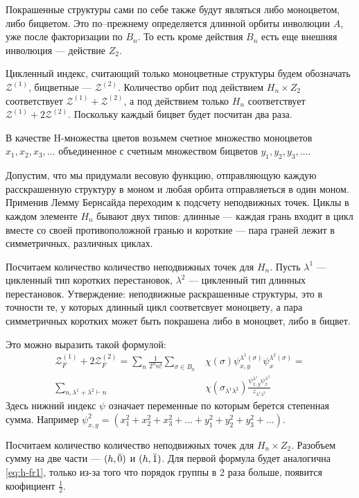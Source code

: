 Покрашенные структуры сами по себе также будут являться либо моноцветом, либо
бицветом. Это по--прежнему определяется длинной орбиты инволюции $A$, уже
после факторизации по $B_n$. То есть кроме действия $B_n$ есть еще внешняя
инволюция --- действие $Z_2$.

Цикленный индекс, считающий только моноцветные структуры будем обозначать
$\mathcal Z^{(1)}$, бицветные --- $\mathcal Z^{(2)}$. Количество орбит под
действием $H_n \times Z_2$ соответствует $\mathcal Z^{(1)} + \mathcal Z^{(2)}$,
а под действием только $H_n$ соответствует $\mathcal Z^{(1)} + 2\mathcal
Z^{(2)}$. Поскольку каждый бицвет будет посчитан два раза.

В качестве H-множества цветов возьмем счетное множество моноцветов $x_1, x_2,
x_3, \dots$ объединенное с счетным множеством бицветов $y_1, y_2, y_3, \dots$.

Допустим, что мы придумали весовую функцию, отправляющую каждую расскрашенную
структуру в моном и любая орбита отправляеться в один моном. Применив Лемму
Бернсайда переходим к подсчету неподвижных точек. Циклы в каждом элементе $H_n$
бывают двух типов:
длинные --- каждая грань входит в цикл вместе со своей противоположной гранью и
короткие --- пара граней лежит в симметричных, различных циклах. 

Посчитаем количество количество неподвижных точек для $H_n$. Пусть $\lambda^1$
--- цикленный тип коротких перестановок, $\lambda^2$ --- цикленный тип длинных
перестановок. Утверждение: неподвижные раскрашенные структуры, это в точности
те, у которых длинный цикл соответсвует моноцвету, а пара симметричных коротких 
может быть покрашена либо в моноцвет, либо в бицвет.

Это можно выразить такой формулой:
\begin{equation}
\label{eq:h-fr1}
\begin{split}
\mathcal Z_F^{(1)} + 2\mathcal Z_F^{(2)} = 
\sum_{n}\frac{1}{2^{n}n!}\sum_{\sigma \in B_n}&\chi(\sigma)
\psi_{x, y}^{\lambda^1(\sigma)} \psi_{x}^{\lambda^2(\sigma)} = \\
\sum_{n, \lambda^1 + \lambda^2 \vdash n}&\chi(\sigma_{\lambda^1 \lambda^2})
\frac{\psi_{x, y}^{\lambda^1} \psi_{x}^{\lambda^2}}{z_{\lambda^1 \lambda^2}}
\end{split}
\end{equation}
Здесь нижний индекс $\psi$ означает переменные по которым берется степенная
сумма. Например $\psi_{x, y}^2 =  (x_1^2 + x_2^2 + x_3^2 + \dots + y_1^2 + y_2^2
+ y_3^2 + \dots)$.

Посчитаем количество количество неподвижных точек для $H_n \times Z_2$. Разобъем
сумму на две части --- $(h, \Bar 0)$ и $(h, \Bar 1)$. Для первой формула будет
аналогична \ref{eq:h-fr1}, только из-за того что порядок группы в 2 раза больше,
появится коофициент $\frac{1}{2}$.

